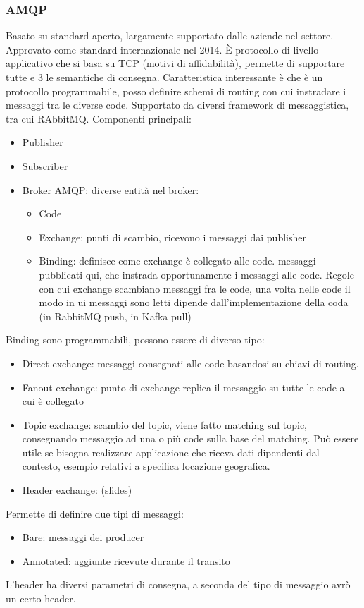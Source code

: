 \documentclass{article}
\begin{document}
\subsubsection{AMQP}
Basato su standard aperto, largamente supportato dalle aziende nel settore. Approvato come standard internazionale nel 2014. È protocollo di livello applicativo che si basa su TCP (motivi di affidabilità), permette di supportare tutte e 3 le semantiche di consegna. Caratteristica interessante è che è un protocollo programmabile, posso definire schemi di routing con cui instradare i messaggi tra le diverse code. Supportato da diversi framework di messaggistica, tra cui RAbbitMQ. Componenti principali:
\begin{itemize}
\item Publisher
\item Subscriber
\item Broker AMQP: diverse entità nel broker:
\begin{itemize}
\item Code
\item Exchange: punti di scambio, ricevono i messaggi dai publisher
\item Binding: definisce come exchange è collegato alle code. messaggi pubblicati qui, che instrada opportunamente i messaggi alle code. Regole con cui exchange scambiano messaggi fra le code, una volta nelle code il modo in ui messaggi sono letti dipende dall'implementazione della coda (in RabbitMQ push, in Kafka pull)
\end{itemize}
\end{itemize}
Binding sono programmabili, possono essere di diverso tipo:
\begin{itemize}
\item Direct exchange: messaggi consegnati alle code basandosi su chiavi di routing.
\item Fanout exchange: punto di exchange replica il messaggio su tutte le code a cui è collegato
\item Topic exchange: scambio del topic, viene fatto matching sul topic, consegnando messaggio ad una o più code sulla base del matching. Può essere utile se bisogna realizzare applicazione che riceva dati dipendenti dal contesto, esempio relativi a specifica locazione geografica.
\item Header exchange: (slides)
\end{itemize}
Permette di definire due tipi di messaggi:
\begin{itemize}
\item Bare: messaggi dei producer
\item Annotated: aggiunte ricevute durante il transito
\end{itemize}
L'header ha diversi parametri di consegna, a seconda del tipo di messaggio avrò un certo header.
\end{document}
